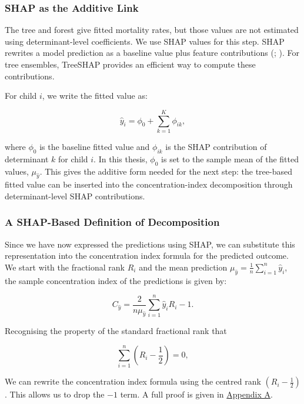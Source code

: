 \documentclass[
  11pt,
  a4paper,
]{article}
\begin{document}
\subsubsection{SHAP as the Additive Link}\label{sec-shap-additive-link}

The tree and forest give fitted mortality rates, but those values are
not estimated using determinant-level coefficients. We use SHAP values
for this step. SHAP rewrites a model prediction as a baseline value plus
feature contributions (; ). For tree ensembles, TreeSHAP provides an efficient way to
compute these contributions.

For child \(i\), we write the fitted value as:

\[
\hat{y}_i = \phi_0 + \sum_{k=1}^{K} \phi_{ik},
\]

where \(\phi_0\) is the baseline fitted value and \(\phi_{ik}\) is the
SHAP contribution of determinant \(k\) for child \(i\). In this thesis,
\(\phi_0\) is set to the sample mean of the fitted values,
\(\mu_{\hat{y}}\). This gives the additive form needed for the next
step: the tree-based fitted value can be inserted into the
concentration-index decomposition through determinant-level SHAP
contributions.

\subsubsection{A SHAP-Based Definition of
Decomposition}\label{sec-shap-decomposition-definition}

Since we have now expressed the predictions using SHAP, we can
substitute this representation into the concentration index formula for
the predicted outcome. We start with the fractional rank \(R_i\) and the
mean prediction \(\mu_{\hat{y}} = \frac{1}{n}\sum_{i=1}^n \hat{y}_i\),
the sample concentration index of the predictions is given by:

\[
C_{\hat{y}} = \frac{2}{n\mu_{\hat{y}}}\sum_{i=1}^n \hat{y}_i R_i - 1.
\]

Recognising the property of the standard fractional rank that

\[
\sum_{i=1}^n \left(R_i - \frac{1}{2}\right)=0,
\]

We can rewrite the concentration index formula using the centred rank
\((R_i - \frac{1}{2})\). This allows us to drop the \(-1\) term. A full
proof is given in \hyperref[app-centered-rank-proof]{Appendix A}.
\end{document}
